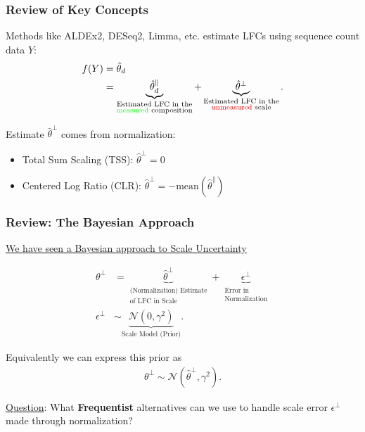 \documentclass[11pt,t]{beamer}
\begin{document}
\begin{frame}
  \frametitle{Review of Key Concepts}

    Methods like ALDEx2, DESeq2, Limma, etc. estimate LFCs using sequence count data \(Y\):
    \begin{align*}
    f(Y) &= \hat{\theta}_d \\
    &= \underbrace{\hat{\theta}^\parallel_d}_{\substack{\text{Estimated LFC in the} \\ \text{\textcolor{green}{measured} composition}}} + \underbrace{\hat{\theta}^\perp}_{\substack{\text{Estimated LFC in the} \\ \text{\textcolor{red}{unmeasured} scale}}}.
    \end{align*}

    Estimate \(\hat{\theta}^\perp\) comes from normalization:
    \begin{itemize}
      \item Total Sum Scaling (TSS): \(\hat{\theta}^\perp=0\)
      \item Centered Log Ratio (CLR): \(\hat{\theta}^\perp=-\text{mean}(\hat{\theta}^\parallel)\)
    \end{itemize}
\end{frame}

\begin{frame}
  \frametitle{Review: The Bayesian Approach}

  \underline{We have seen a Bayesian approach to Scale Uncertainty}

  \begin{align*}
    \theta^\perp &= \underbrace{\hat{\theta}^\perp}_{\substack{\text{(Normalization) Estimate} \\ \text{of LFC in Scale}}} + \underbrace{\epsilon^\perp}_{\substack{\text{Error in} \\ \text{Normalization}}} \\
    \epsilon^\perp &\sim \underbrace{\mathcal{N}\left(0, \gamma^2\right)}_{\text{Scale Model (Prior)}}.
  \end{align*}

  Equivalently we can express this prior as
  \begin{align*}
    \theta^\perp \sim \mathcal{N}\left(\hat{\theta}^\perp, \gamma^2\right).
  \end{align*}

  \pause
\end{frame}

\begin{frame}
  \begin{center}
    \underline{Question}:
    What \textbf{Frequentist} alternatives can we use to handle scale error \(\epsilon^\perp\) made through normalization?
  \end{center}
\end{frame}
  
\end{document}
